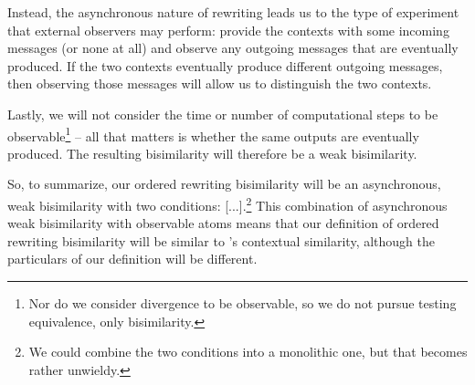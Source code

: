 Instead, the asynchronous nature of rewriting leads us to the type of experiment that external observers may perform: provide the contexts with some incoming messages (or none at all) and observe any outgoing messages that are eventually produced.
If the two contexts eventually produce different outgoing messages, then observing those messages will allow us to distinguish the two contexts.

Lastly, we will not consider the time or number of computational steps to be observable\footnote{Nor do we consider divergence to be observable, so we do not pursue testing equivalence, only bisimilarity.} -- all that matters is whether the same outputs are eventually produced.
The resulting bisimilarity will therefore be a weak bisimilarity.

So, to summarize, our ordered rewriting bisimilarity will be an asynchronous, weak bisimilarity with two conditions: [...].\footnote{We could combine the two conditions into a monolithic one, but that becomes rather unwieldy.}
This combination of asynchronous weak bisimilarity with observable atoms means that our definition of ordered rewriting bisimilarity will be similar to \citeauthor{Deng+:MSCS16}'s contextual similarity, although the particulars of our definition will be different.

